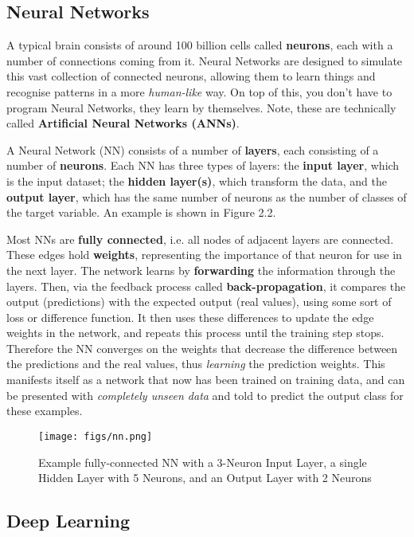 \documentclass[12pt,a4paper,twoside,openright]{report}
\begin{document}
\subsection{Neural Networks}

A typical brain consists of around 100 billion cells called \textbf{neurons}, each with a number of connections coming from it. Neural Networks are designed to simulate this vast collection of connected neurons, allowing them to learn things and recognise patterns in a more \textit{human-like} way. On top of this, you don't have to program Neural Networks, they learn by themselves. Note, these are technically called \textbf{Artificial Neural Networks (ANNs)}.

A Neural Network (NN) consists of a number of \textbf{layers}, each consisting of a number of \textbf{neurons}. Each NN has three types of layers: the \textbf{input layer}, which is the input dataset; the \textbf{hidden layer(s)}, which transform the data, and the \textbf{output layer}, which has the same number of neurons as the number of classes of the target variable. An example is shown in Figure 2.2.

Most NNs are \textbf{fully connected}, i.e. all nodes of adjacent layers are connected. These edges hold \textbf{weights}, representing the importance of that neuron for use in the next layer. The network learns by \textbf{forwarding} the information through the layers. Then, via the feedback process called \textbf{back-propagation}, it compares the output (predictions) with the expected output (real values), using some sort of loss or difference function. It then uses these differences to update the edge weights in the network, and repeats this process until the training step stops. Therefore the NN converges on the weights that decrease the difference between the predictions and the real values, thus \textit{learning} the prediction weights. This manifests itself as a network that now has been trained on training data, and can be presented with \textit{completely unseen data} and told to predict the output class for these examples.

\begin{figure}[h]
  \centering
  \texttt{[image: figs/nn.png]}
  \caption{Example fully-connected NN with a 3-Neuron Input Layer, a single Hidden Layer with 5 Neurons, and an Output Layer with 2 Neurons}
  \label{fig:nn}
\end{figure}

\subsection{Deep Learning}
\end{document}
